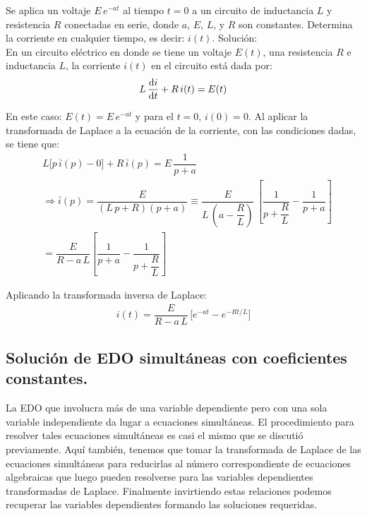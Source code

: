 \begin{ejemplo}
Se aplica un voltaje $E \, e^{- a t}$ al tiempo $t = 0$ a un circuito de inductancia $L$ y resistencia $R$ conectadas en serie, donde $a$, $E$, $L$, y $R$ son constantes. Determina la corriente en cualquier tiempo, es decir: $i(t)$.
\noindent Solución:
\\[0.5em]
En un circuito eléctrico en donde se tiene un voltaje $E(t)$, una resistencia $R$ e inductancia $L$, la corriente $i(t)$ en el circuito está dada por:
\begin{align*}
L \, \dv{i}{t} + R \, i(t) =  E(t)
\end{align*}

En este caso: $E(t) = E \, e^{-a t}$ y para el $t = 0$, $i(0) = 0$. Al aplicar la transformada de Laplace a la ecuación de la corriente, con las condiciones dadas, se tiene que:
\begin{align*}
&L \big[ p \, \overline{i}(p) - 0 \big] + R \, \overline{i} (p) = E \, \dfrac{1}{p + a} \\[0.5em]
&\Rightarrow \overline{i}(p) = \dfrac{E}{(L \, p + R)(p + a)} \equiv \dfrac{E}{L \, \left(a - \dfrac{R}{L} \right)} \, \left[ \dfrac{1}{p + \dfrac{R}{L}}  - \dfrac{1}{p + a}\right] \\[0.5em]
&= \dfrac{E}{R - a \, L} \left[ \dfrac{1}{p + a} - \dfrac{1}{p + \dfrac{R}{L}}\right]
\end{align*}

Aplicando la transformada inversa de Laplace:
\begin{align*}
i(t) = \dfrac{E}{R - a \, L} \, \big[ e^{-a t} - e^{-R t /L}\big]
\end{align*}
\end{ejemplo}

\subsection{Solución de EDO simultáneas con coeficientes constantes.}

La EDO que involucra más de una variable dependiente pero con una sola variable independiente da lugar a ecuaciones simultáneas. El procedimiento para resolver tales ecuaciones simultáneas es casi el mismo que se discutió previamente. Aquí también, tenemos que tomar la transformada de Laplace de las ecuaciones simultáneas para reducirlas al número correspondiente de ecuaciones algebraicas que luego pueden resolverse para las variables dependientes transformadas de Laplace. Finalmente invirtiendo estas relaciones podemos recuperar las variables dependientes formando las soluciones requeridas.

